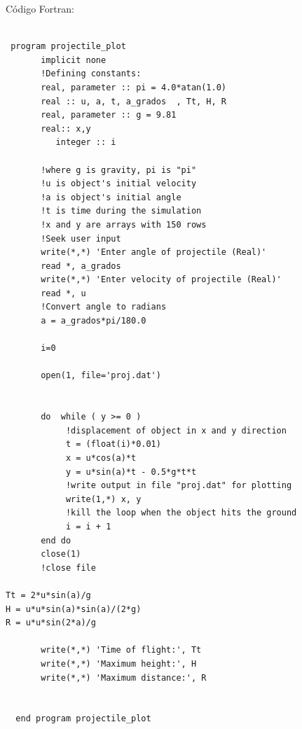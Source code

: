 \documentclass{article}
\begin{document}
C\'odigo Fortran:\\
\begin{Verbatim}[frame=single]

 program projectile_plot  
       implicit none  
       !Defining constants:  
       real, parameter :: pi = 4.0*atan(1.0) 
       real :: u, a, t, a_grados  , Tt, H, R
       real, parameter :: g = 9.81  
       real:: x,y  
          integer :: i 

       !where g is gravity, pi is "pi"   
       !u is object's initial velocity   
       !a is object's initial angle   
       !t is time during the simulation   
       !x and y are arrays with 150 rows   
       !Seek user input   
       write(*,*) 'Enter angle of projectile (Real)'   
       read *, a_grados   
       write(*,*) 'Enter velocity of projectile (Real)'   
       read *, u   
       !Convert angle to radians   
       a = a_grados*pi/180.0   
      
       i=0

       open(1, file='proj.dat')   
      

       do  while ( y >= 0 )
            !displacement of object in x and y direction   
            t = (float(i)*0.01)   
            x = u*cos(a)*t   
            y = u*sin(a)*t - 0.5*g*t*t   
            !write output in file "proj.dat" for plotting   
            write(1,*) x, y  
            !kill the loop when the object hits the ground    
            i = i + 1
       end do   
       close(1)   
       !close file
       
Tt = 2*u*sin(a)/g
H = u*u*sin(a)*sin(a)/(2*g)
R = u*u*sin(2*a)/g

       write(*,*) 'Time of flight:', Tt
       write(*,*) 'Maximum height:', H
       write(*,*) 'Maximum distance:', R

   
  end program projectile_plot 



\end{Verbatim}
\end{document}
